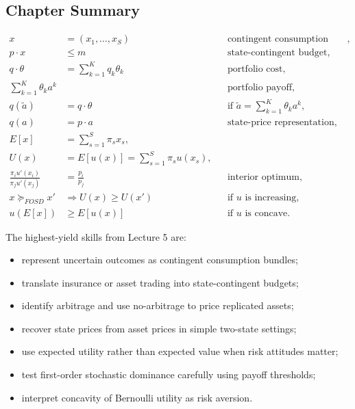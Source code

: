 \subsection{Chapter Summary}

\begin{keyformula}[title={Key Formula: Lecture 5 Summary}]
\begin{align*}
x &= (x_1,\dots,x_S) && \text{contingent consumption bundle}, \\
p\cdot x &\le m && \text{state-contingent budget}, \\
q\cdot \theta &= \sum_{k=1}^K q_k \theta_k && \text{portfolio cost}, \\
\sum_{k=1}^K \theta_k a^k &&& \text{portfolio payoff}, \\
q(\tilde a) &= q\cdot \theta && \text{if } \tilde a=\sum_{k=1}^K \theta_k a^k, \\
q(a) &= p\cdot a && \text{state-price representation}, \\
E[x] &= \sum_{s=1}^S \pi_s x_s, \\
U(x) &= E[u(x)] = \sum_{s=1}^S \pi_s u(x_s), \\
\frac{\pi_i u'(x_i)}{\pi_j u'(x_j)} &= \frac{p_i}{p_j} && \text{interior optimum}, \\
x \succeq_{FOSD} x' &\Longrightarrow U(x)\ge U(x') && \text{if } u \text{ is increasing}, \\
u(E[x]) &\ge E[u(x)] && \text{if } u \text{ is concave}.
\end{align*}
\end{keyformula}

\begin{examtip}
The highest-yield skills from Lecture 5 are:
\begin{itemize}
    \item represent uncertain outcomes as contingent consumption bundles;
    \item translate insurance or asset trading into state-contingent budgets;
    \item identify arbitrage and use no-arbitrage to price replicated assets;
    \item recover state prices from asset prices in simple two-state settings;
    \item use expected utility rather than expected value when risk attitudes matter;
    \item test first-order stochastic dominance carefully using payoff thresholds;
    \item interpret concavity of Bernoulli utility as risk aversion.
\end{itemize}
\end{examtip}